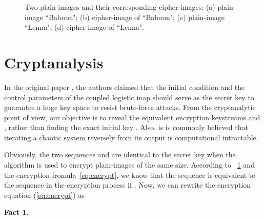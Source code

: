 \documentclass[smallextended, final]{svjour3}          \smartqed
\newlength\imagewidth
\newtheorem{Fact}{Fact}
\begin{document}
\begin{figure}[!htb]
\centering
{}
\caption{Two plain-images and their corresponding cipher-images:
(a) plain-image ``Baboon";
(b) cipher-image of ``Baboon";
(c) plain-image ``Lenna";
(d) cipher-image of ``Lenna".}
\label{fig:encryption}
\end{figure}


\section{Cryptanalysis}
\label{sec:cryptanalysis}
In the original paper \cite{li2012image}, the authors claimed that
the initial condition  and the control parameters
 of the  coupled logistic
map should serve as the secret key to guarantee a huge key space
to resist brute-force attacks. From the cryptanalytic point of view, our objective
is to reveal the equivalent encryption keystreams  and  \cite[Sec.~3]{zhang2014cryptanalysis},
rather than finding the exact initial key .
Also, is is commonly believed that iterating a chaotic system reversely from its output is computational intractable.


Obviously, the two sequences  and  are
identical to the secret key when the algorithm is used to
encrypt plain-images of the same size. According to ~\ref{fact} and
the encryption fromula~\eqref{eq:encrypt}, we know that the sequence
 is equivalent to the sequence 
in the encryption process if .
Now, we can rewrite the encryption equation (\ref{eq:encrypt}) as

\begin{Fact}
\label{fact}

\end{Fact}
\end{document}
